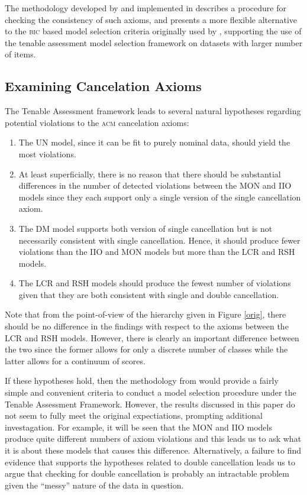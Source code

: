\documentclass[12pt]{article}
\begin{document}
The methodology developed by  and implemented in  describes a procedure for checking the consistency of such axioms, and presents a more flexible alternative to the \textsc{bic} based model selection criteria originally used by , supporting the use of the tenable assessment model selection framework on datasets with larger number of items.

\subsection{Examining Cancelation Axioms}

The Tenable Assessment framework \citep{torres2012} leads to several natural hypotheses regarding potential violations to the \textsc{acm} cancelation axioms:
\begin{enumerate}
\item The UN model, since it can be fit to purely nominal data, should yield the most violations.
\item At least superficially, there is no reason that there should be substantial differences in the number of detected violations between the MON and IIO models since they each support only a single version of the single cancellation axiom.
\item The DM model supports both version of single cancellation but is not necessarily consistent with single cancellation. Hence, it should produce fewer violations than the IIO and MON models but more than the LCR and RSH models.
\item The LCR and RSH models should produce the fewest number of violations given that they are both consistent with single and double cancellation.
\end{enumerate}
Note that from the point-of-view of the hierarchy given in Figure \ref{orig}, there should be no difference in the findings with respect to the axioms between the LCR and RSH models. However, there is clearly an important difference between the two since the former allows for only a discrete number of classes while the latter allows for a continuum of scores. 

If these hypotheses hold, then the methodology from  would provide a fairly simple and convenient criteria to conduct a model selection procedure under the Tenable Assessment Framework. However, the results discussed in this paper do not seem to fully meet the original expectiations, prompting additional investagation. For example, it will be seen that the MON and IIO models produce quite different numbers of axiom violations and this leads us to ask what it is about these models that causes this difference. Alternatively, a failure to find evidence that supports the hypotheses related to double cancellation leads us to argue that checking for double cancellation is probably an intractable problem given the ``messy'' nature of the data in question.
\end{document}
